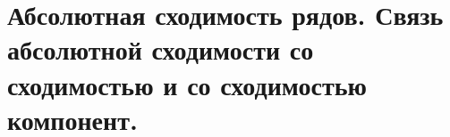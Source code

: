 \documentclass[../main.tex]{subfiles}
\begin{document}
\newpage
\section{Абсолютная сходимость рядов. Связь абсолютной сходимости со сходимостью и со сходимостью компонент.}
\end{document}
